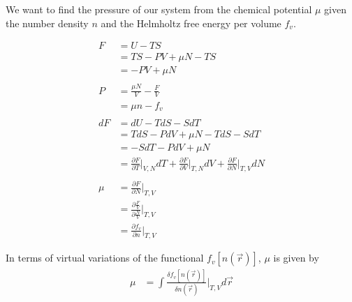 \documentclass[double,12pt]{beavtex}
\begin{document}
We want to find the pressure of our system from the chemical potential 
$\mu$ given the number density $n$ and the Helmholtz free energy per 
volume $f_v$. 

\begin{align}
	F &= U - TS  \\
	  &= TS -PV + \mu N - TS  \\
	  &= -PV + \mu N  \\ \nonumber\\
%
	P &= \frac{\mu N}{V} - \frac{F}{V} \\
	  &= \mu n - f_v   \\ \nonumber\\
%
	dF &= dU - TdS -SdT \\
	   &= TdS - PdV + \mu N  - TdS -SdT\\
	   &=  -SdT - PdV + \mu N \\
	   &= \frac{\partial F}{\partial T}\bigg|_{V,N}dT 
	       + \frac{\partial F}{\partial V}\bigg|_{T,N}dV 
	       + \frac{\partial F}{\partial N}\bigg|_{T,V}dN \\ \nonumber\\
%
    \mu &= \frac{\partial F}{\partial N}\bigg|_{T,V} \\
        &= \frac{\partial \frac{F}{V}}{\partial \frac{N}{V}}\bigg|_{T,V}\\
        &= \frac{\partial f_v}{\partial n}\bigg|_{T,V}  
\end{align}

In terms of virtual variations of the functional $f_v[n(\vec r)]$, 
$\mu$ is given by
\begin{align}
    \mu &= \int \frac{\delta f_v[n(\vec r)]}{\delta n(\vec r)}
    \bigg|_{T,V} d\vec{r}
\end{align}
\end{document}

